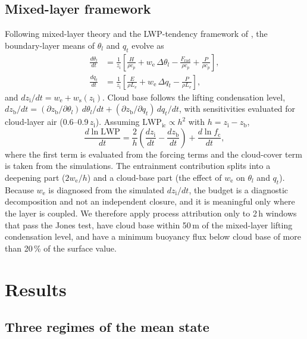 \documentclass[acp, manuscript]{copernicus}
\newcommand{\LWP}{\mathrm{LWP}}
\newcommand{\we}{w_\mathrm{e}}
\newcommand{\zi}{z_\mathrm{i}}
\newcommand{\zb}{z_\mathrm{b}}
\begin{document}
\subsection{Mixed-layer framework}\label{sec:mlb}

Following mixed-layer theory \citep{lilly1968,stevens2002} and the LWP-tendency framework of \citet{vanderdussen2014}, the boundary-layer means of $\theta_l$ and $q_t$ evolve as
\begin{align}
\frac{d\theta_l}{dt} &= \frac{1}{\zi}\left[\frac{H}{\rho c_p} + \we\,\Delta\theta_l - \frac{F_\mathrm{rad}}{\rho c_p} + \frac{P}{\rho c_p}\right], \label{eq:thl}\\
\frac{dq_t}{dt} &= \frac{1}{\zi}\left[\frac{E}{\rho L_v} + \we\,\Delta q_t - \frac{P}{\rho L_v}\right], \label{eq:qt}
\end{align}
and $d\zi/dt=\we+w_\mathrm{s}(\zi)$. Cloud base follows the lifting condensation level, $d\zb/dt=(\partial\zb/\partial\theta_l)\,d\theta_l/dt+(\partial\zb/\partial q_t)\,dq_t/dt$, with sensitivities evaluated for cloud-layer air (0.6--0.9\,$\zi$). Assuming $\LWP_\mathrm{ic}\propto h^2$ with $h=\zi-\zb$,
\begin{equation}
\frac{d\ln\LWP}{dt} = \frac{2}{h}\left(\frac{d\zi}{dt}-\frac{d\zb}{dt}\right) + \frac{d\ln f_\mathrm{c}}{dt},
\label{eq:lwpbudget}
\end{equation}
where the first term is evaluated from the forcing terms and the cloud-cover term is taken from the simulations. The entrainment contribution splits into a deepening part ($2\we/h$) and a cloud-base part (the effect of $\we$ on $\theta_l$ and $q_t$). Because $\we$ is diagnosed from the simulated $d\zi/dt$, the budget is a diagnostic decomposition and not an independent closure, and it is meaningful only where the layer is coupled. We therefore apply process attribution only to 2\,h windows that pass the Jones test, have cloud base within 50\,m of the mixed-layer lifting condensation level, and have a minimum buoyancy flux below cloud base of more than 20\,\% of the surface value.

\section{Results}\label{sec:results}

\subsection{Three regimes of the mean state}\label{sec:regimes}
\end{document}

